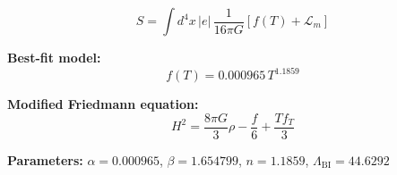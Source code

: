 
\begin{equation}
  S = \int d^4x \, |e| \, \frac{1}{16\pi G} \left[ f(T) + \mathcal{L}_m \right]
\end{equation}

\textbf{Best-fit model:}
\begin{equation}
  f(T) = 0.000965 \, T^{1.1859}
\end{equation}

\textbf{Modified Friedmann equation:}
\begin{equation}
  H^2 = \frac{8\pi G}{3} \rho - \frac{f}{6} + \frac{T f_T}{3}
\end{equation}

\textbf{Parameters:}
$\alpha = 0.000965$, \quad
$\beta = 1.654799$, \quad
$n = 1.1859$, \quad
$\Lambda_{\text{BI}} = 44.6292$